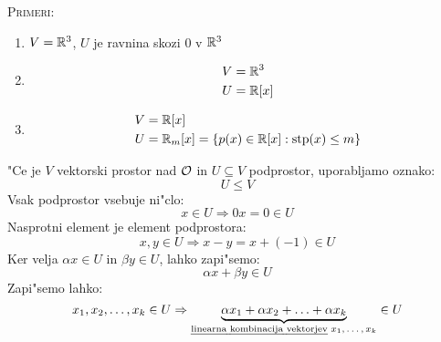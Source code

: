\textsc{Primeri:}
\begin{enumerate}[(1)]
	\item $V = \mathbb{R}^3$, $U$ je ravnina skozi $0$ v $\mathbb{R}^3$
	
	\item 
	\begin{align*}
	V &= \mathbb{R}^3 \\
	U &= \mathbb{R}[x]
	\end{align*}
	
	\item 
	\begin{align*}
	V &= \mathbb{R}[x] \\
	U &= \mathbb{R}_m[x] = \{p(x) \in \mathbb{R}[x]: \text{stp}(x) \leq m\}
	\end{align*}
\end{enumerate}
"Ce je $V$ vektorski prostor nad $\mathcal{O}$ in $U \subseteq V$ podprostor, uporabljamo oznako:
\begin{equation*}
U \leq V
\end{equation*}
Vsak podprostor vsebuje ni"clo:
\begin{equation*}
x \in U \Rightarrow 0x = 0 \in U
\end{equation*}
Nasprotni element je element podprostora:
\begin{equation*}
x, y \in U \Rightarrow x - y = x + (-1) \in U
\end{equation*}
Ker velja $\alpha x \in U$ in $\beta y \in U$, lahko zapi"semo:
\begin{equation*}
\alpha x + \beta y \in U
\end{equation*}
Zapi"semo lahko:
\begin{equation*}
x_1, x_2, \ldots, x_k \in U \Rightarrow \underbrace{\alpha x_1 + \alpha x_2 + \ldots + \alpha x_k}_{\text{\emph{linearna kombinacija vektorjev} $x_1, \ldots, x_k$}} \in U
\end{equation*}
